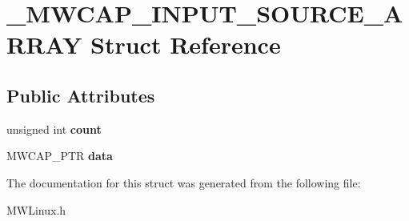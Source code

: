 \hypertarget{struct__MWCAP__INPUT__SOURCE__ARRAY}{\section{\-\_\-\-M\-W\-C\-A\-P\-\_\-\-I\-N\-P\-U\-T\-\_\-\-S\-O\-U\-R\-C\-E\-\_\-\-A\-R\-R\-A\-Y Struct Reference}
\label{struct__MWCAP__INPUT__SOURCE__ARRAY}
}
\subsection*{Public Attributes}
\begin{DoxyCompactItemize}
\item 
\hypertarget{struct__MWCAP__INPUT__SOURCE__ARRAY_ac994911a717c25cf821b306486658d30}{unsigned int {\bfseries count}}\label{struct__MWCAP__INPUT__SOURCE__ARRAY_ac994911a717c25cf821b306486658d30}

\item 
\hypertarget{struct__MWCAP__INPUT__SOURCE__ARRAY_a50acf92f1686363275b997771c0909ae}{M\-W\-C\-A\-P\-\_\-\-P\-T\-R {\bfseries data}}\label{struct__MWCAP__INPUT__SOURCE__ARRAY_a50acf92f1686363275b997771c0909ae}

\end{DoxyCompactItemize}


The documentation for this struct was generated from the following file\-:\begin{DoxyCompactItemize}
\item 
M\-W\-Linux.\-h\end{DoxyCompactItemize}

